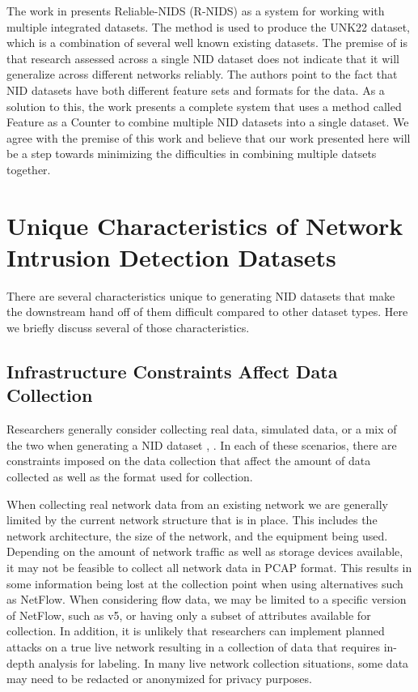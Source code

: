 \documentclass[conference]{IEEEtran}
\begin{document}
The work in \cite{9787094} presents Reliable-NIDS (R-NIDS) as a system for working with multiple integrated datasets.
The method is used to produce the UNK22 dataset, which is a combination of several well known existing datasets.
The premise of \cite{9787094} is that research assessed across a single NID dataset does not indicate that it will generalize across different networks reliably.
The authors point to the fact that NID datasets have both different feature sets and formats for the data.
As a solution to this, the work presents a complete system that uses a method called Feature as a Counter to combine multiple NID datasets into a single dataset.
We agree with the premise of this work and believe that our work presented here will be a step towards minimizing the difficulties in combining multiple datsets together.

\section{Unique Characteristics of Network Intrusion Detection Datasets}\label{sec:characteristics}
There are several characteristics unique to generating NID  datasets that make the downstream hand off of them difficult compared to other dataset types.
Here we briefly discuss several of those characteristics.

\subsection{Infrastructure Constraints Affect Data Collection}\label{subsec:infrastructure}
Researchers generally consider collecting real data, simulated data, or a mix of the two when generating a NID dataset \cite{Chou2022}, \cite{ring2019survey}. 
In each of these scenarios, there are constraints imposed on the data collection that affect the amount of data collected as well as the format used for collection.

When collecting real network data from an existing network we are generally limited by the current network structure that is in place.
This includes the network architecture, the size of the network, and the equipment being used.
Depending on the amount of network traffic as well as storage devices available, it may not be feasible to collect all network data in PCAP format.
This results in some information being lost at the collection point when using alternatives such as NetFlow.
When considering flow data, we may be limited to a specific version of NetFlow, such as v5, or having only a subset of attributes available for collection.
In addition, it is unlikely that researchers can implement planned attacks on a true live network resulting in a collection of data that requires in-depth analysis for labeling.
In many live network collection situations, some data may need to be redacted or anonymized for privacy purposes.
\end{document}
